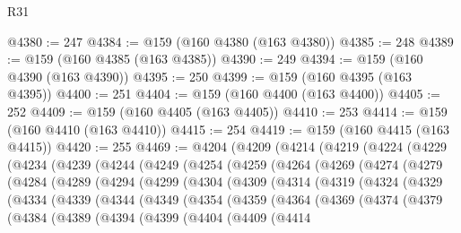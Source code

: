 \begin{lexlean}{R31}
\begin{coremodule}
@4380 := 247
@4384 := @159 (@160 @4380 (@163 @4380))
@4385 := 248
@4389 := @159 (@160 @4385 (@163 @4385))
@4390 := 249
@4394 := @159 (@160 @4390 (@163 @4390))
@4395 := 250
@4399 := @159 (@160 @4395 (@163 @4395))
@4400 := 251
@4404 := @159 (@160 @4400 (@163 @4400))
@4405 := 252
@4409 := @159 (@160 @4405 (@163 @4405))
@4410 := 253
@4414 := @159 (@160 @4410 (@163 @4410))
@4415 := 254
@4419 := @159 (@160 @4415 (@163 @4415))
@4420 := 255
@4469 := @4204
    (@4209
      (@4214
        (@4219
          (@4224
            (@4229
              (@4234
                (@4239
                  (@4244
                    (@4249
                      (@4254
                        (@4259
                          (@4264
                            (@4269
                              (@4274
                                (@4279
                                  (@4284
                                    (@4289
                                      (@4294
                                        (@4299
                                          (@4304
                                            (@4309
                                              (@4314
                                                (@4319
                                                  (@4324
                                                    (@4329
                                                      (@4334
                                                        (@4339
                                                          (@4344
                                                            (@4349
                                                              (@4354
                                                                (@4359
                                                                  (@4364
                                                                    (@4369
                                                                      (@4374
                                                                        (@4379
                                                                          (@4384
                                                                            (@4389
                                                                              (@4394
                                                                                (@4399
                                                                                  (@4404
                                                                                    (@4409
                                                                                      (@4414

\end{coremodule}
\end{lexlean}

